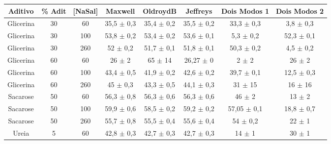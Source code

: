 	\begin{table}[h]
		\begin{adjustbox}{angle=90}
	{%
		\begin{tabular}{c c c | c c c c c}
			\toprule
			 Aditivo  & \% Adit & [NaSal] & Maxwell             & OldroydB             & Jeffreys             & Dois Modos 1            & Dois Modos 2            \\ \midrule
			Glicerina & 30         & 60         & 35,5    \(\pm\) 0,3 & 35,4     \(\pm\) 0,2 & 35,5     \(\pm\) 0,2 & 33,3        \(\pm\) 0,3 & 3,8         \(\pm\) 0,3 \\
			Glicerina & 30         & 100        & 53,8    \(\pm\) 0,2 & 53,4     \(\pm\) 0,2 & 53,6     \(\pm\) 0,1 & 5,3         \(\pm\) 0,2 & 52,3        \(\pm\) 0,1 \\
			Glicerina & 30         & 260        & 52      \(\pm\) 0,2 & 51,7     \(\pm\) 0,1 & 51,8     \(\pm\) 0,1 & 50,3        \(\pm\) 0,2 & 4,5         \(\pm\) 0,2 \\ 
			Glicerina & 60         & 60         & 26      \(\pm\) 2   & 65       \(\pm\) 14  & 26,27    \(\pm\) 0   & 2           \(\pm\) 2   & 26          \(\pm\) 2   \\
			Glicerina & 60         & 100        & 43,4    \(\pm\) 0,5 & 41,9     \(\pm\) 0,2 & 42,6     \(\pm\) 0,2 & 39,7        \(\pm\) 0,1 & 12,5        \(\pm\) 0,3 \\
			Glicerina & 60         & 260        & 45      \(\pm\) 0,3 & 43,3     \(\pm\) 0,5 & 44,1     \(\pm\) 0,3 & 31          \(\pm\) 15  & 16          \(\pm\) 16  \\ 
			Sacarose  & 50         & 60         & 56,3    \(\pm\) 0,8 & 56,3     \(\pm\) 0,6 & 56,3     \(\pm\) 0,6 & 46          \(\pm\) 2   & 13          \(\pm\) 2   \\
			Sacarose  & 50         & 100        & 59,9    \(\pm\) 0,6 & 58,5     \(\pm\) 0,2 & 59,2     \(\pm\) 0,2 & 57,05       \(\pm\) 0,1 & 18,8        \(\pm\) 0,7 \\
			Sacarose  & 50         & 260        & 55,7    \(\pm\) 0,8 & 55,5     \(\pm\) 0,4 & 55,6     \(\pm\) 0,4 & 54          \(\pm\) 0,2 & 22          \(\pm\) 1   \\  \midrule
			  Ureia   & 5          & 60         & 42,8    \(\pm\) 0,3 & 42,7     \(\pm\) 0,3 & 42,7     \(\pm\) 0,3 & 14          \(\pm\) 1   & 30          \(\pm\) 1   \\

\end{tabular}}
\end{adjustbox}
\end{table}
